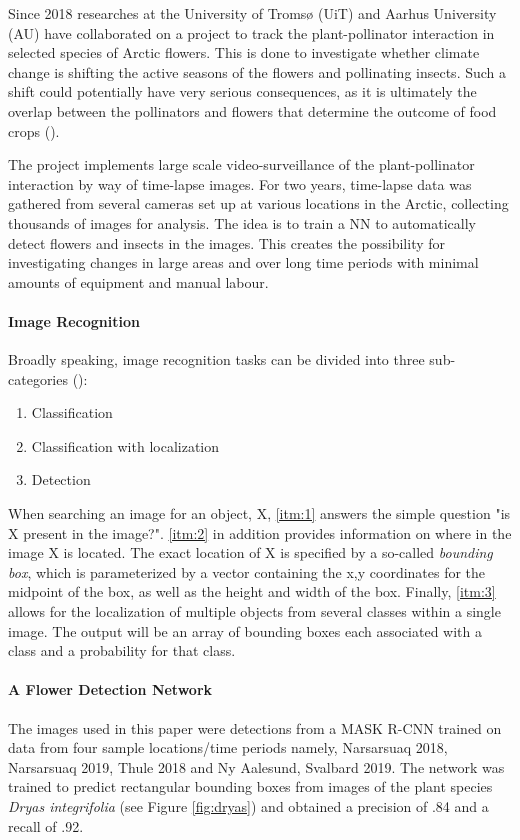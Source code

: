 \documentclass[12pt]{article}
\begin{document}
Since 2018 researches at the University of Tromsø (UiT) and Aarhus University (AU) have collaborated on a project to track the plant-pollinator interaction in selected species of Arctic flowers. This is done to investigate whether climate change is shifting the active seasons of the flowers and pollinating insects. Such a shift could potentially have very serious consequences, as it is ultimately the overlap between the pollinators and flowers that determine the outcome of food crops (\cite{danmarksfrieforskningsfondAaretsOriginaleIde2019}).

The project implements large scale video-surveillance of the plant-pollinator interaction by way of time-lapse images. For two years, time-lapse data was gathered from several cameras set up at various locations in the Arctic, collecting thousands of images for analysis. The idea is to train a NN to automatically detect flowers and insects in the images. This creates the possibility for investigating changes in large areas and over long time periods with minimal amounts of equipment and manual labour.

\paragraph{Image Recognition}
Broadly speaking, image recognition tasks can be divided into three sub-categories (\cite{deeplearning.aiC4W3L01ObjectLocalization2017}):

\begin{enumerate}
	\item Classification\label{itm:1}
	\item Classification with localization\label{itm:2}
	\item Detection\label{itm:3}
\end{enumerate}

When searching an image for an object, X, \ref{itm:1} answers the simple question "is X present in the image?". \ref{itm:2} in addition provides information on where in the image X is located. The exact location of X is specified by a so-called \textit{bounding box}, which is parameterized by a vector containing the x,y coordinates for the midpoint of the box, as well as the height and width of the box. Finally, \ref{itm:3} allows for the localization of multiple objects from several classes within a single image. The output will be an array of bounding boxes each associated with a class and a probability for that class.

\paragraph{A Flower Detection Network}
The images used in this paper were detections from a MASK R-CNN trained on data from four sample locations/time periods namely, Narsarsuaq 2018, Narsarsuaq 2019, Thule 2018 and Ny Aalesund, Svalbard 2019. The network was trained to predict rectangular bounding boxes from images of the plant species \textit{Dryas integrifolia} (see Figure \ref{fig:dryas}) and obtained a precision of .84 and a recall of .92.
\end{document}
